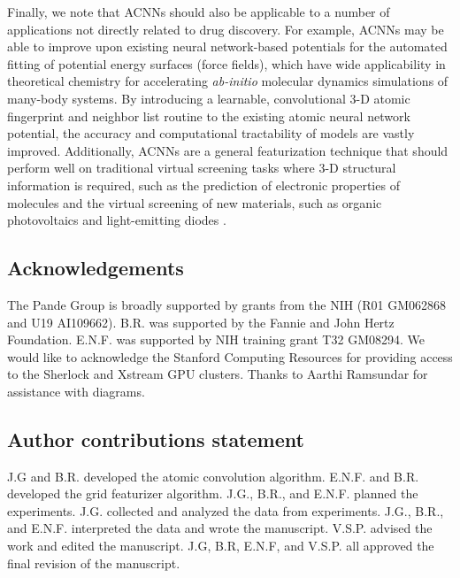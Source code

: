 Finally, we note that ACNNs should also be applicable to a number of applications not directly related to drug discovery. For example, ACNNs may be able to improve upon existing neural network-based potentials for the automated fitting of potential energy surfaces (force fields), which have wide applicability in theoretical chemistry for accelerating \textit{ab-initio} molecular dynamics simulations of many-body systems.  By introducing a learnable, convolutional 3-D atomic fingerprint and neighbor list routine to the existing atomic neural network potential, the accuracy and computational tractability of models are vastly improved. Additionally, ACNNs are a general featurization technique that should perform well on traditional virtual screening tasks where 3-D structural information is required, such as the prediction of electronic properties of molecules \cite{montavon2013machine} and the virtual screening of new materials, such as organic photovoltaics \cite{hachmann2011harvard} and light-emitting diodes \cite{gomez2016design}.


\subsection{Acknowledgements}

The Pande Group is broadly supported by grants from the NIH (R01 GM062868 and U19 AI109662).  B.R. was supported by the Fannie and John Hertz Foundation. E.N.F. was supported by NIH training grant T32 GM08294.  We would like to acknowledge the Stanford Computing Resources for providing access to the Sherlock and Xstream GPU clusters. Thanks to Aarthi Ramsundar for assistance with diagrams.

\subsection{Author contributions statement}
J.G and B.R. developed the atomic convolution algorithm.  E.N.F. and B.R. developed the grid featurizer algorithm.  J.G., B.R., and E.N.F. planned the experiments.  J.G. collected and analyzed the data from experiments. J.G., B.R., and E.N.F. interpreted the data and wrote the manuscript.  V.S.P. advised the work and edited the manuscript.  J.G, B.R, E.N.F, and V.S.P. all approved the final revision of the manuscript.
